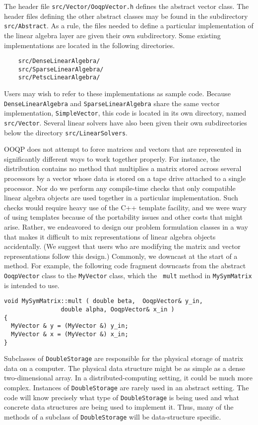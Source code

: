 The header file \texttt{src/Vector/OoqpVector.h} defines the abstract
vector class. The header files defining the other abstract classes may
be found in the subdirectory \texttt{src/Abstract}. As a rule, the
files needed to define a particular implementation of the linear
algebra layer are given their own subdirectory. Some existing
implementations are located in the following directories.
\begin{verbatim}
    src/DenseLinearAlgebra/
    src/SparseLinearAlgebra/
    src/PetscLinearAlgebra/
\end{verbatim}
Users may wish to refer to these implementations as sample code.
Because \texttt{DenseLinearAlgebra} and \texttt{SparseLinearAlgebra}
share the same vector implementation, \texttt{SimpleVector}, this code
is located in its own directory, named \texttt{src/Vector}.
Several linear solvers have also been given their own subdirectories
below the directory \texttt{src/LinearSolvers}.

OOQP does not attempt to force matrices and vectors that are
represented in significantly different ways to work together properly.
For instance, the distribution contains no method that multiplies a
matrix stored across several processors by a vector whose data is
stored on a tape drive attached to a single processor. Nor do we
perform any compile-time checks that only compatible linear algebra
objects are used together in a particular implementation.  Such checks
would require heavy use of the C++ template facility, and we were wary
of using templates because of the portability issues and other costs
that might arise. Rather, we endeavored to design our problem
formulation classes in a way that makes it difficult to mix
representations of linear algebra objects accidentally.  (We suggest
that users who are modifying the matrix and vector representations
follow this design.)  Commonly, we downcast at the start of a method.
For example, the following code fragment downcasts from the abstract
{\tt OoqpVector} class to the {\tt MyVector} class, which the {\tt
  mult} method in {\tt MySymMatrix} is intended to use.
\begin{verbatim}
void MySymMatrix::mult ( double beta,  OoqpVector& y_in,
                double alpha, OoqpVector& x_in )
{
  MyVector & y = (MyVector &) y_in;
  MyVector & x = (MyVector &) x_in;
}
\end{verbatim}

Subclasses of \texttt{DoubleStorage} are responsible for the physical
storage of matrix data on a computer. The physical data structure
might be as simple as a dense two-dimensional array. In a
distributed-computing setting, it could be much more complex. 
Instances of \texttt{DoubleStorage} are rarely used in an abstract
setting. The code will know precisely what type of
\texttt{DoubleStorage} is being used and what concrete data structures
are being used to implement it. Thus, many of the methods of a
subclass of \texttt{DoubleStorage} will be data-structure specific.

